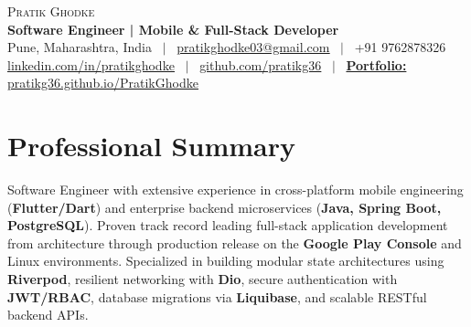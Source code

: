 \documentclass[letterpaper,10.8pt]{article}
\begin{document}
\begin{center}
    {\Huge \scshape Pratik Ghodke} \\ \vspace{2pt}
    \textbf{Software Engineer | Mobile \& Full-Stack Developer} \\ \vspace{3pt}
    \small Pune, Maharashtra, India \ $|$ \ 
    \href{mailto:pratikghodke03@gmail.com}{\underline{pratikghodke03@gmail.com}} \ $|$ \ 
    +91 9762878326 \\ \vspace{1pt}
    \href{https://linkedin.com/in/pratikghodke}{\underline{linkedin.com/in/pratikghodke}} \ $|$ \ 
    \href{https://github.com/pratikg36}{\underline{github.com/pratikg36}} \ $|$ \ 
    \href{https://pratikg36.github.io/PratikGhodke/}{\textbf{Portfolio:} \underline{pratikg36.github.io/PratikGhodke}}
\end{center}

\section{Professional Summary}
\small{
Software Engineer with extensive experience in cross-platform mobile engineering (\textbf{Flutter/Dart}) and enterprise backend microservices (\textbf{Java, Spring Boot, PostgreSQL}). Proven track record leading full-stack application development from architecture through production release on the \textbf{Google Play Console} and Linux environments. Specialized in building modular state architectures using \textbf{Riverpod}, resilient networking with \textbf{Dio}, secure authentication with \textbf{JWT/RBAC}, database migrations via \textbf{Liquibase}, and scalable RESTful backend APIs.
}

\end{document}
